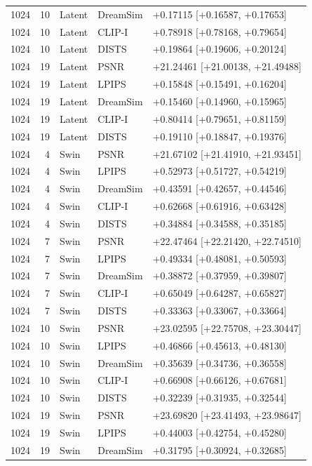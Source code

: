 \documentclass[10pt,letterpaper]{article}
\begin{document}
\begin{longtable}{@{}rrlll@{}}
1024 & 10 & Latent & DreamSim & +0.17115 [+0.16587, +0.17653]\\
1024 & 10 & Latent & CLIP-I & +0.78918 [+0.78168, +0.79654]\\
1024 & 10 & Latent & DISTS & +0.19864 [+0.19606, +0.20124]\\
1024 & 19 & Latent & PSNR & +21.24461 [+21.00138, +21.49488]\\
1024 & 19 & Latent & LPIPS & +0.15848 [+0.15491, +0.16204]\\
1024 & 19 & Latent & DreamSim & +0.15460 [+0.14960, +0.15965]\\
1024 & 19 & Latent & CLIP-I & +0.80414 [+0.79651, +0.81159]\\
1024 & 19 & Latent & DISTS & +0.19110 [+0.18847, +0.19376]\\
1024 & 4 & Swin & PSNR & +21.67102 [+21.41910, +21.93451]\\
1024 & 4 & Swin & LPIPS & +0.52973 [+0.51727, +0.54219]\\
1024 & 4 & Swin & DreamSim & +0.43591 [+0.42657, +0.44546]\\
1024 & 4 & Swin & CLIP-I & +0.62668 [+0.61916, +0.63428]\\
1024 & 4 & Swin & DISTS & +0.34884 [+0.34588, +0.35185]\\
1024 & 7 & Swin & PSNR & +22.47464 [+22.21420, +22.74510]\\
1024 & 7 & Swin & LPIPS & +0.49334 [+0.48081, +0.50593]\\
1024 & 7 & Swin & DreamSim & +0.38872 [+0.37959, +0.39807]\\
1024 & 7 & Swin & CLIP-I & +0.65049 [+0.64287, +0.65827]\\
1024 & 7 & Swin & DISTS & +0.33363 [+0.33067, +0.33664]\\
1024 & 10 & Swin & PSNR & +23.02595 [+22.75708, +23.30447]\\
1024 & 10 & Swin & LPIPS & +0.46866 [+0.45613, +0.48130]\\
1024 & 10 & Swin & DreamSim & +0.35639 [+0.34736, +0.36558]\\
1024 & 10 & Swin & CLIP-I & +0.66908 [+0.66126, +0.67681]\\
1024 & 10 & Swin & DISTS & +0.32239 [+0.31935, +0.32544]\\
1024 & 19 & Swin & PSNR & +23.69820 [+23.41493, +23.98647]\\
1024 & 19 & Swin & LPIPS & +0.44003 [+0.42754, +0.45280]\\
1024 & 19 & Swin & DreamSim & +0.31795 [+0.30924, +0.32685]\\

\end{longtable}
\end{document}
